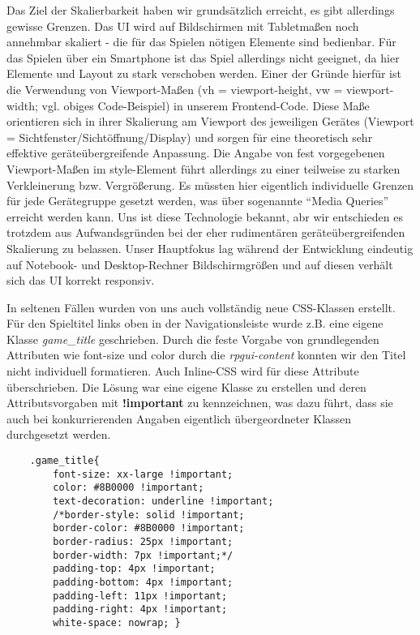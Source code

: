 Das Ziel der Skalierbarkeit haben wir grundsätzlich erreicht, es gibt allerdings gewisse Grenzen. Das UI wird auf Bildschirmen mit Tabletmaßen noch annehmbar skaliert - die für das Spielen nötigen Elemente sind bedienbar. Für das Spielen über ein Smartphone ist das Spiel allerdings nicht geeignet, da hier Elemente und Layout zu stark verschoben werden. Einer der Gründe hierfür ist die Verwendung von Viewport-Maßen (vh = viewport-height, vw = viewport-width; vgl. obiges Code-Beispiel) in unserem Frontend-Code. Diese Maße orientieren sich in ihrer Skalierung am Viewport des jeweiligen Gerätes (Viewport = Sichtfenster/Sichtöffnung/Display) und sorgen für eine theoretisch sehr effektive geräteübergreifende Anpassung. Die Angabe von fest vorgegebenen Viewport-Maßen im style-Element führt allerdings zu einer teilweise zu starken Verkleinerung bzw. Vergrößerung. Es müssten hier eigentlich individuelle Grenzen für jede Gerätegruppe gesetzt werden, was über sogenannte \enquote{Media Queries} erreicht werden kann. Uns ist diese Technologie bekannt, abr wir entschieden es trotzdem aus Aufwandsgründen bei der eher rudimentären geräteübergreifenden Skalierung zu belassen. Unser Hauptfokus lag während der Entwicklung eindeutig auf Notebook- und Desktop-Rechner Bildschirmgrößen und auf diesen verhält sich das UI korrekt responsiv.

In seltenen Fällen wurden von uns auch vollständig neue CSS-Klassen erstellt. Für den Spieltitel links oben in der Navigationsleiste wurde z.B. eine eigene Klasse \textit{game\_title} geschrieben. Durch die feste Vorgabe von grundlegenden Attributen wie font-size und color durch die \textit{rpgui-content} konnten wir den Titel nicht individuell formatieren. Auch Inline-CSS wird für diese Attribute überschrieben. Die Lösung war eine eigene Klasse zu erstellen und deren Attributsvorgaben mit \textbf{!important} zu kennzeichnen, was dazu führt, dass sie auch bei konkurrierenden Angaben eigentlich übergeordneter Klassen durchgesetzt werden.

\begin{lstlisting}
    .game_title{
        font-size: xx-large !important;
        color: #8B0000 !important;
        text-decoration: underline !important;
        /*border-style: solid !important;
        border-color: #8B0000 !important;
        border-radius: 25px !important;
        border-width: 7px !important;*/
        padding-top: 4px !important;
        padding-bottom: 4px !important;
        padding-left: 11px !important;
        padding-right: 4px !important;
        white-space: nowrap; }
\end{lstlisting}




    
